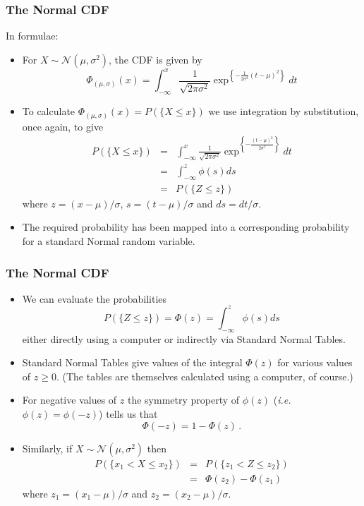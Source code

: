 \documentclass[notes=show,smaller,handout]{beamer}\usepackage[]{graphicx}\usepackage[]{color}
\renewcommand{\Pr}{P}
\newcommand{\N}{\mathcal{N}}
\newenvironment{stepitemize}{\begin{itemize}[<+->]}{\end{itemize} }
\begin{document}
\begin{frame}%

\frametitle{The Normal CDF}
In formulae:
\begin{stepitemize}
\item For $X\sim \N\left( \mu ,\sigma ^{2}\right) $, the CDF is given by%
$$
\Phi_{(\mu,\sigma)}\left( x\right) =\int_{-\infty }^{x}\frac{1}{\sqrt{2\pi \sigma ^{2}}}\exp^{ \left\{ -\frac{1}{2\sigma ^{2}}\left( t-\mu \right) ^{2}\right\}} dt
$$
\item To calculate $\Phi_{(\mu,\sigma)}\left( x\right)=\Pr(\{X\leq x\})$ we use integration by substitution, once again, to give
\begin{eqnarray*}
\Pr(\{ X\leq x\} )&=&\int_{-\infty}^x\frac{1}{\sqrt{2\pi\sigma^2}}\exp^{\left\{-\frac{(t-\mu)^2}{2\sigma^2}\right\}}dt\\
 &=&\int_{-\infty}^z\phi(s)ds\\
  &=&P(\{Z\leq z\})
\end{eqnarray*}
where $z=(x-\mu)/\sigma$, $s=(t-\mu)/\sigma$ and $ds=dt/\sigma$.
\item The required probability has been mapped into a corresponding probability for a standard Normal random variable.
\end{stepitemize}

\end{frame}%

\begin{frame}%

\frametitle{The Normal CDF}

\begin{stepitemize}
\item We can evaluate the probabilities
$$
\Pr(\{Z\leq z\})=\Phi(z)=\int_{-\infty}^z\phi(s)ds
$$
either directly using a computer or indirectly via Standard Normal
Tables.
\item Standard Normal Tables give values of the integral $\Phi(z)$ for various values of $z\geq 0$. (The tables are themselves
calculated using a computer, of course.)
\item For negative values of $z$ the symmetry property of $\phi(z)$ (\textit{i.e.} $\phi(z)=\phi(-z)$) tells us that
$$
\Phi(-z)=1-\Phi(z)\,.
$$
\item Similarly, if $X\sim \N\left( \mu ,\sigma ^{2}\right) $ then
\begin{eqnarray*}
\Pr(\{x_1<X\leq x_2\})&=&\Pr(\{z_1<Z\leq z_2\})\\
 &=&\Phi(z_2)-\Phi(z_1)
 \end{eqnarray*}
where $z_1=(x_1-\mu)/\sigma$ and $z_2=(x_2-\mu)/\sigma$.

\end{stepitemize}

\end{frame}%
\end{document}
